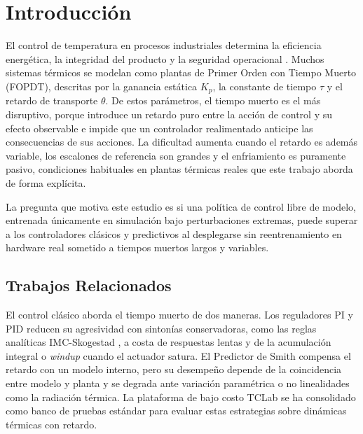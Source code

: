 \documentclass[processes,article,submit,moreauthors,pdftex]{Definitions/mdpi}
\begin{document}
\section{Introducción}
\label{sec:intro}

El control de temperatura en procesos industriales determina la eficiencia
energética, la integridad del producto y la seguridad operacional
\cite{Seborg2016}. Muchos sistemas térmicos se modelan como plantas de
Primer Orden con Tiempo Muerto (FOPDT), descritas por la ganancia estática
$K_p$, la constante de tiempo $\tau$ y el retardo de transporte $\theta$.
De estos parámetros, el tiempo muerto es el más disruptivo, porque
introduce un retardo puro entre la acción de control y su efecto observable
e impide que un controlador realimentado anticipe las consecuencias de sus
acciones. La dificultad aumenta cuando el retardo es además variable, los
escalones de referencia son grandes y el enfriamiento es puramente pasivo,
condiciones habituales en plantas térmicas reales que este trabajo aborda
de forma explícita.

La pregunta que motiva este estudio es si una política de control libre de
modelo, entrenada únicamente en simulación bajo perturbaciones extremas,
puede superar a los controladores clásicos y predictivos al desplegarse sin
reentrenamiento en hardware real sometido a tiempos muertos largos y
variables.

\subsection{Trabajos Relacionados}
\label{subsec:related}

El control clásico aborda el tiempo muerto de dos maneras. Los reguladores
PI y PID \cite{Astrom2006} reducen su agresividad con sintonías
conservadoras, como las reglas analíticas IMC-Skogestad \cite{Skogestad2003},
a costa de respuestas lentas y de la acumulación integral o \textit{windup}
cuando el actuador satura. El Predictor de Smith \cite{Smith1957} compensa
el retardo con un modelo interno, pero su desempeño depende de la
coincidencia entre modelo y planta \cite{NormeyRico2007} y se degrada ante
variación paramétrica o no linealidades como la radiación térmica. La
plataforma de bajo costo TCLab \cite{Hedengren2019,Park2020} se ha
consolidado como banco de pruebas estándar para evaluar estas estrategias
sobre dinámicas térmicas con retardo.
\end{document}
